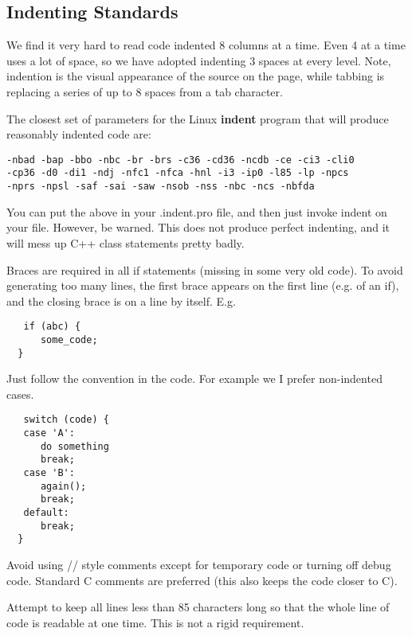 \subsection{Indenting Standards}

We find it very hard to read code indented 8 columns at a time. 
Even 4 at a time uses a lot of space, so we have adopted indenting
3 spaces at every level. Note, indention is the visual appearance of the
source on the page, while tabbing is replacing a series of up to 8 spaces from
a tab character. 

The closest set of parameters for the Linux {\bf indent} program that will
produce reasonably indented code are: 

\footnotesize
\begin{verbatim}
-nbad -bap -bbo -nbc -br -brs -c36 -cd36 -ncdb -ce -ci3 -cli0
-cp36 -d0 -di1 -ndj -nfc1 -nfca -hnl -i3 -ip0 -l85 -lp -npcs
-nprs -npsl -saf -sai -saw -nsob -nss -nbc -ncs -nbfda
\end{verbatim}
\normalsize

You can put the above in your .indent.pro file, and then just invoke indent on
your file. However, be warned. This does not produce perfect indenting, and it
will mess up C++ class statements pretty badly. 

Braces are required in all if statements (missing in some very old code). To
avoid generating too many lines, the first brace appears on the first line
(e.g. of an if), and the closing brace is on a line by itself. E.g. 

\footnotesize
\begin{verbatim}
   if (abc) {
      some_code;
  }
\end{verbatim}
\normalsize

Just follow the convention in the code. For example we I prefer non-indented cases. 

\footnotesize
\begin{verbatim}
   switch (code) {
   case 'A':
      do something
      break;
   case 'B':
      again();
      break;
   default:
      break;
  }
\end{verbatim}
\normalsize

Avoid using // style comments except for temporary code or turning off debug
code. Standard C comments are preferred (this also keeps the code closer to
C). 

Attempt to keep all lines less than 85 characters long so that the whole line
of code is readable at one time. This is not a rigid requirement. 

